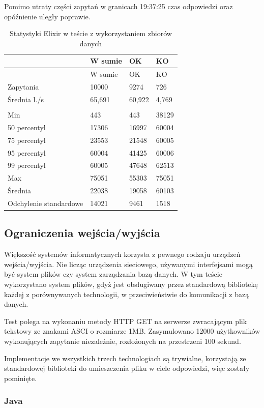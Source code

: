 \documentclass[12pt,twoside]{article}
\begin{document}
Pomimo utraty części zapytań w granicach 19:37:25 czas odpowiedzi oraz
opóźnienie uległy poprawie.

\begin{longtable}[c]{@{}llll@{}}
\caption{Statystyki Elixir w teście z wykorzystaniem zbiorów
danych}\tabularnewline
\toprule
& W sumie & OK & KO\tabularnewline
\midrule
\endfirsthead
\toprule
& W sumie & OK & KO\tabularnewline
\midrule
\endhead
Zapytania & 10000 & 9274 & 726\tabularnewline
Średnia l./s & 65,691 & 60,922 & 4,769\tabularnewline
& & &\tabularnewline
Min & 443 & 443 & 38129\tabularnewline
50 percentyl & 17306 & 16997 & 60004\tabularnewline
75 percentyl & 23553 & 21548 & 60005\tabularnewline
95 percentyl & 60004 & 41425 & 60006\tabularnewline
99 percentyl & 60005 & 47648 & 62513\tabularnewline
Max & 75051 & 55303 & 75051\tabularnewline
Średnia & 22038 & 19058 & 60103\tabularnewline
Odchylenie standardowe & 14021 & 9461 & 1518\tabularnewline
\bottomrule
\end{longtable}

\clearpage

\subsection{Ograniczenia
wejścia/wyjścia}\label{ograniczenia-wejux15bciawyjux15bcia}

Większość systemów informatycznych korzysta z pewnego rodzaju urządzeń
wejścia/wyjścia. Nie licząc urządzenia sieciowego, używanymi
interfejsami mogą być system plików czy system zarządzania bazą danych.
W tym teście wykorzystano system plików, gdyż jest obsługiwany przez
standardową bibliotekę każdej z porównywanych technologii, w
przeciwieństwie do komunikacji z bazą danych.

Test polega na wykonaniu metody HTTP GET na serwerze zwracającym plik
tekstowy ze znakami ASCI o rozmiarze 1MB. Zasymulowano 12000
użytkowników wykonujących zapytanie niezależnie, rozłożonych na
przestrzeni 100 sekund.

Implementacje we wszystkich trzech technologiach są trywialne,
korzystają ze standardowej biblioteki do umieszczenia pliku w ciele
odpowiedzi, więc zostały pominięte.

\subsubsection{Java}\label{java-3}
\end{document}

